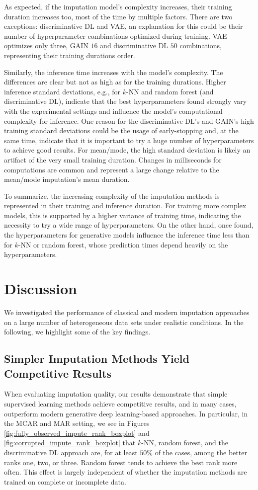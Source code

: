 \documentclass[utf8]{frontiersSCNS} %
\begin{document}
As expected, if the imputation model's complexity increases, their training duration increases too, most of the time by multiple factors. There are two exceptions: discriminative DL and VAE, an explanation for this could be their number of hyperparameter combinations optimized during training. VAE optimizes only three, GAIN $16$ and discriminative DL $50$ combinations, representing their training durations order.

Similarly, the inference time increases with the model's complexity. The differences are clear but not as high as for the training durations.
Higher inference standard deviations, e.g., for $k$-NN and random forest (and discriminative DL), indicate that the best hyperparameters found strongly vary with the experimental settings and influence the model's computational complexity for inference. One reason for the discriminative DL's and GAIN's high training standard deviations could be the usage of early-stopping and, at the same time, indicate that it is important to try a huge number of hyperparameters to achieve good results. For mean/mode, the high standard deviation is likely an artifact of the very small training duration. Changes in milliseconds for computations are common and represent a large change relative to the mean/mode imputation's mean duration.

To summarize, the increasing complexity of the imputation methods is represented in their training and inference duration. For training more complex models, this is supported by a higher variance of training time, indicating the necessity to try a wide range of hyperparameters. On the other hand, once found, the hyperparameters for generative models influence the inference time less than for $k$-NN or random forest, whose prediction times depend heavily on the hyperparameters.


\section{Discussion}
\label{sec:discussion}

We investigated the performance of classical and modern imputation approaches on a large number of heterogeneous data sets under realistic conditions. In the following, we highlight some of the key findings.

\subsection{Simpler Imputation Methods Yield Competitive Results}
%
When evaluating imputation quality, our results demonstrate that simple supervised learning methods achieve competitive results, and in many cases, outperform modern generative deep learning-based approaches. In particular, in the MCAR and MAR setting, we see in Figures \ref{fig:fully_observed_impute_rank_boxplot} and \ref{fig:corrupted_impute_rank_boxplot} that $k$-NN, random forest, and the discriminative DL approach are, for at least $50\%$ of the cases, among the better ranks one, two, or three. Random forest tends to achieve the best rank more often. This effect is largely independent of whether the imputation methods are trained on complete or incomplete data.
\end{document}
